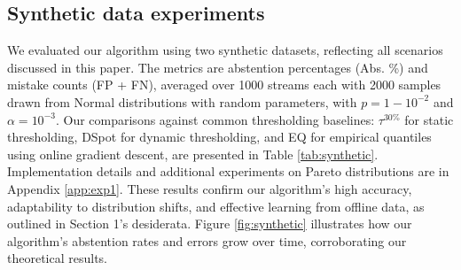 \subsection{Synthetic data experiments}
We evaluated our algorithm using two synthetic datasets, reflecting all scenarios discussed in this paper. The metrics are abstention percentages (Abs. \%) and mistake counts (FP + FN), averaged over 1000 streams each with 2000 samples drawn from Normal distributions with random parameters, with $p=1-10^{-2}$ and $\alpha=10^{-3}$. Our comparisons against common thresholding baselines: $\tau^{30\%}$ for static thresholding, {\ttfamily DSpot} for dynamic thresholding, and {\ttfamily EQ} for empirical quantiles using online gradient descent, are presented in Table \ref{tab:synthetic}. Implementation details and additional experiments on Pareto distributions are in Appendix \ref{app:exp1}. These results confirm our algorithm's high accuracy, adaptability to distribution shifts, and effective learning from offline data, as outlined in Section 1's desiderata. Figure \ref{fig:synthetic} illustrates how our algorithm's abstention rates and errors grow over time, corroborating our theoretical results.
